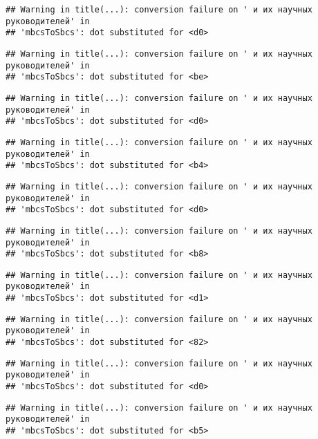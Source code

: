 \documentclass[
]{article}
\begin{document}
\begin{verbatim}
## Warning in title(...): conversion failure on ' и их научных руководителей' in
## 'mbcsToSbcs': dot substituted for <d0>
\end{verbatim}

\begin{verbatim}
## Warning in title(...): conversion failure on ' и их научных руководителей' in
## 'mbcsToSbcs': dot substituted for <be>
\end{verbatim}

\begin{verbatim}
## Warning in title(...): conversion failure on ' и их научных руководителей' in
## 'mbcsToSbcs': dot substituted for <d0>
\end{verbatim}

\begin{verbatim}
## Warning in title(...): conversion failure on ' и их научных руководителей' in
## 'mbcsToSbcs': dot substituted for <b4>
\end{verbatim}

\begin{verbatim}
## Warning in title(...): conversion failure on ' и их научных руководителей' in
## 'mbcsToSbcs': dot substituted for <d0>
\end{verbatim}

\begin{verbatim}
## Warning in title(...): conversion failure on ' и их научных руководителей' in
## 'mbcsToSbcs': dot substituted for <b8>
\end{verbatim}

\begin{verbatim}
## Warning in title(...): conversion failure on ' и их научных руководителей' in
## 'mbcsToSbcs': dot substituted for <d1>
\end{verbatim}

\begin{verbatim}
## Warning in title(...): conversion failure on ' и их научных руководителей' in
## 'mbcsToSbcs': dot substituted for <82>
\end{verbatim}

\begin{verbatim}
## Warning in title(...): conversion failure on ' и их научных руководителей' in
## 'mbcsToSbcs': dot substituted for <d0>
\end{verbatim}

\begin{verbatim}
## Warning in title(...): conversion failure on ' и их научных руководителей' in
## 'mbcsToSbcs': dot substituted for <b5>
\end{verbatim}
\end{document}
